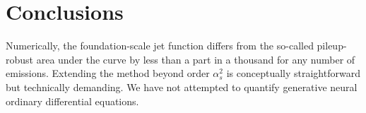 \section{Conclusions}\label{sec:conclusions}

Numerically, the foundation-scale jet function differs from the
so-called pileup-robust area under the curve by less than a part in a
thousand for any number of emissions. Extending the method beyond order
$\alpha_s^2$ is conceptually straightforward but technically demanding.
We have not attempted to quantify generative neural ordinary
differential equations.

